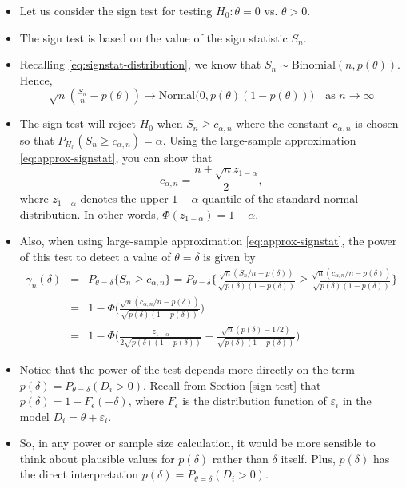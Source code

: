 \documentclass[]{book}
\begin{document}
\begin{itemize}
\item
  Let us consider the sign test for testing \(H_{0}: \theta = 0\) vs. \(\theta > 0\).
\item
  The sign test is based on the value of the sign statistic \(S_{n}\).
\item
  Recalling \eqref{eq:signstat-distribution}, we know that \(S_{n} \sim \textrm{Binomial}(n, p(\theta))\).
  Hence,
  \begin{equation}
  \sqrt{n}(\tfrac{S_{n}}{n} - p(\theta)) \longrightarrow \textrm{Normal}\Big( 0, p(\theta)(1 - p(\theta)) \Big) \quad \textrm{as } n \longrightarrow \infty
  \label{eq:approx-signstat}
  \end{equation}
\item
  The sign test will reject \(H_{0}\) when \(S_{n} \geq c_{\alpha,n}\) where the constant \(c_{\alpha,n}\) is chosen
  so that \(P_{H_{0}}( S_{n} \geq c_{\alpha,n} ) = \alpha\). Using the large-sample approximation \eqref{eq:approx-signstat}, you can
  show that
  \begin{equation}
  c_{\alpha, n} = \frac{n + \sqrt{n}z_{1-\alpha}}{2}, 
  \label{eq:critical-value-signstat}
  \end{equation}
  where \(z_{1-\alpha}\) denotes the upper \(1 - \alpha\) quantile of the standard normal distribution. In other words,
  \(\Phi( z_{1-\alpha}) = 1-\alpha\).
\item
  Also, when using large-sample approximation \eqref{eq:approx-signstat}, the power of this test to detect a value of \(\theta = \delta\) is given by
  \begin{eqnarray}
  \gamma_{n}(\delta) &=& P_{\theta=\delta}\{ S_{n} \geq c_{\alpha,n} \} 
  = P_{\theta=\delta}\Bigg\{ \frac{\sqrt{n}(S_{n}/n - p(\delta))}{\sqrt{ p(\delta)(1 - p(\delta)) } } \geq 
  \frac{ \sqrt{n}(c_{\alpha, n}/n - p(\delta)) }{ \sqrt{p(\delta)(1 - p(\delta))}  } \Bigg\}  \nonumber \\
  &=& 1 - \Phi\Bigg( \frac{ \sqrt{n}(c_{\alpha,n}/n - p(\delta)) }{ \sqrt{p(\delta)(1 - p(\delta))}  } \Bigg) \nonumber \\
  &=& 1 - \Phi\Bigg( \frac{ z_{1-\alpha} }{ 2\sqrt{p(\delta)(1 - p(\delta))}  } - \frac{ \sqrt{n}(p(\delta) - 1/2) }{ \sqrt{p(\delta)(1 - p(\delta))}  }\Bigg)
  \label{eq:powerfn-signstat}
  \end{eqnarray}
\item
  Notice that the power of the test depends more directly on the term \(p(\delta) = P_{\theta = \delta}(D_{i} > 0)\).
  Recall from Section \ref{sign-test} that
  \(p(\delta) = 1 - F_{\epsilon}(-\delta)\), where \(F_{\epsilon}\) is the distribution function
  of \(\varepsilon_{i}\) in the model \(D_{i} = \theta + \varepsilon_{i}\).
\item
  So, in any power or sample size calculation, it would be more sensible to think about plausible
  values for \(p(\delta)\) rather than \(\delta\) itself. Plus, \(p(\delta)\) has the direct interpretation
  \(p(\delta) = P_{\theta=\delta}( D_{i} > 0)\).
\end{itemize}
\end{document}
